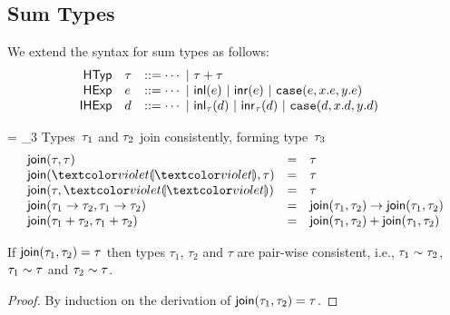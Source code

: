
\subsection{Sum Types}


We extend the syntax for sum types as follows:
\[
\begin{array}{rllllll}
\mathsf{HTyp} & \tau & ::= \cdots ~\vert~ {\tau + \tau} &
\\
\mathsf{HExp} & e & ::= \cdots
~\vert~ \mathsf{inl}(e)
~\vert~ \mathsf{inr}(e)
~\vert~ \texttt{case}({e},{x}.{e},{y}.{e})
\\
\mathsf{IHExp} & d & ::= \cdots
~\vert~ \mathsf{inl}_{\tau}(d)
~\vert~ \mathsf{inr}_{\tau}(d)
~\vert~ \texttt{case}({d},{x}.{d},{y}.{d})
\end{array}
\]



\judgbox
 { = \htau_3}
 {Types~$\tau_1$ and $\tau_2$ join consistently, forming type~$\tau_3$}
\[
\begin{array}{lcl}
\JoinTypes{\htau}{\htau} &=&  \htau
\\
\JoinTypes{\tehole}{\htau} &=&  \htau
\\
\JoinTypes{\htau}{\tehole} &=&  \htau
\\
\JoinTypes
{\tarr{\htau_1}{\htau_2}}
{\tarr{\htau_1}{\htau_2}}
&=&
\tarr{\JoinTypes{\htau_1}{\htau_2}}
     {\JoinTypes{\htau_1}{\htau_2}}
\\
\JoinTypes
{\tsum{\htau_1}{\htau_2}}
{\tsum{\htau_1}{\htau_2}}
&=&
\tsum{\JoinTypes{\htau_1}{\htau_2}}
     {\JoinTypes{\htau_1}{\htau_2}}
\end{array}
\]

\begin{thm}[Joins]
If $\textsf{join}(\tau_1,\tau_2) = \tau$
%
then types $\tau_1$, $\tau_2$ and $\tau$ are pair-wise consistent, i.e.,
%
$\tau_1 \sim \tau_2$,
$\tau_1 \sim \tau$ and
$\tau_2 \sim \tau$.
\begin{proof}
By induction on the derivation of $\textsf{join}(\tau_1,\tau_2) = \tau$.
\end{proof}
\end{thm}

